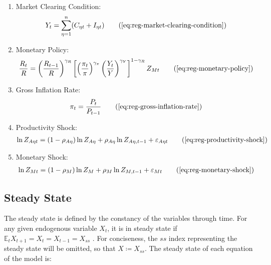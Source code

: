 \documentclass[
	thesis.tex
	]{subfiles}
\begin{document}
{\begin{itemize}
\begin{enumerate}
			\item Market Clearing Condition:
			\begin{align}
				Y_t = \sum_{\eta=1}^{n} (C_{\eta t} + I_{\eta t}) \tag{\ref{eq:reg-market-clearing-condition}}
			\end{align}
			
			\item Monetary Policy:
			\begin{align}
				\frac{R_t}{R} = \left( 
				\frac{R_{t-1}}{R} \right)^{\gamma_R} \left[ \left(
				\frac{\pi_t}{\pi} \right)^{\gamma_\pi} \left( 
				\frac{Y_t}{Y} \right)^{\gamma_Y} \right]^{1-\gamma_R} Z_{Mt}
				\tag{\ref{eq:reg-monetary-policy}}
			\end{align}
			
			\item Gross Inflation Rate:
			\begin{align}
				\pi_t = \frac{P_t}{P_{t-1}}
				\tag{\ref{eq:reg-gross-inflation-rate}}
			\end{align}
			
			\item Productivity Shock:
			\begin{align}
				\ln{Z_{A\eta t}} = (1-\rho_{A\eta})\ln{Z_{A\eta}} + \rho_{A\eta}\ln{Z_{A\eta,t-1}} + \varepsilon_{A\eta t}
				\tag{\ref{eq:reg-productivity-shock}}
			\end{align}
			
			\item Monetary Shock:
			\begin{align}
				\ln{Z_{Mt}} = (1-\rho_M)\ln{Z_{M}} + \rho_M\ln{Z_{M,t-1}} + \varepsilon_{Mt}
				\tag{\ref{eq:reg-monetary-shock}}
			\end{align}
			
		\end{enumerate}
		
	\end{itemize}
	
} %



\subsection{Steady State}

The steady state is defined by the constancy of the variables through time. For any given endogenous variable $X_t$, it is in steady state if $\mathbb{E}_t X_{t+1} = X_t = X_{t-1} = X_{ss}$ \cite[p.41]{costa_junior_understanding_2016}. For conciseness, the $ss$ index representing the steady state will be omitted, so that $X \coloneq X_{ss}$. The steady state of each equation of the model is:
\end{document}
